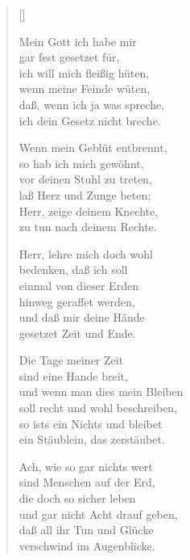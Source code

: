 \begin{multicols}{2}
\settowidth{\versewidth}{Wenn mein Geblüt entbrennt,}
\begin{verse}[\versewidth]

 Mein Gott ich habe mir\\
gar fest gesetzet für,\\
ich will mich fleißig hüten,\\
wenn meine Feinde wüten,\\
daß, wenn ich ja was spreche,\\
ich dein Gesetz nicht breche.

 Wenn mein Geblüt entbrennt,\\
so hab ich mich gewöhnt,\\
vor deinen Stuhl zu treten,\\
laß Herz und Zunge beten;\\
Herr, zeige deinem Knechte,\\
zu tun nach deinem Rechte.

 Herr, lehre mich doch wohl\\
bedenken, daß ich soll\\
einmal von dieser Erden\\
hinweg geraffet werden,\\
und daß mir deine Hände\\
gesetzet Zeit und Ende.

 Die Tage meiner Zeit\\
sind eine Hande breit,\\
und wenn man dies mein Bleiben\\
soll recht und wohl beschreiben,\\
so ists ein Nichts und bleibet\\
ein Stäublein, das zerstäubet.

 Ach, wie so gar nichts wert\\
sind Menschen auf der Erd,\\
die doch so sicher leben\\
und gar nicht Acht drauf geben,\\
daß all ihr Tun und Glücke\\
verschwind im Augenblicke.


\end{verse}
\end{multicols}
